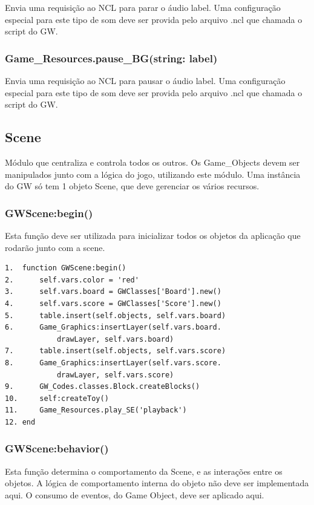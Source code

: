 \documentclass[
	12pt,				%
	openright,			%
	oneside,			%
	a4paper,			%
	brazil,				%
	]{abntex2}
\begin{document}
Envia uma requisição ao NCL para parar o áudio label. Uma configuração especial para este tipo de som deve ser provida pelo arquivo .ncl que chamada o script do GW.

\subsubsection{Game\_Resources.pause\_BG(string: label)}

Envia uma requisição ao NCL para pausar o áudio label. Uma configuração especial para este tipo de som deve ser provida pelo arquivo .ncl que chamada o script do GW.

\subsection{Scene}

Módulo que centraliza e controla todos os outros. Os Game\_Objects devem ser manipulados junto com a lógica do jogo, utilizando este módulo. Uma instância do GW só tem 1 objeto Scene, que deve gerenciar os vários recursos. 

\subsubsection{GWScene:begin()}

Esta função deve ser utilizada para inicializar todos os objetos da aplicação que rodarão junto com a scene.

\begin{lstlisting}[caption={Exemplo de uso da função begin},label=cod_scene_1,frame=single]
1.	function GWScene:begin()
2.		self.vars.color = 'red'
3.		self.vars.board = GWClasses['Board'].new()
4.		self.vars.score = GWClasses['Score'].new()
5.		table.insert(self.objects, self.vars.board)
6.		Game_Graphics:insertLayer(self.vars.board.
			drawLayer, self.vars.board)
7.		table.insert(self.objects, self.vars.score)
8.		Game_Graphics:insertLayer(self.vars.score.
			drawLayer, self.vars.score)
9.		GW_Codes.classes.Block.createBlocks()
10.		self:createToy()
11.		Game_Resources.play_SE('playback')
12.	end
\end{lstlisting}

\subsubsection{GWScene:behavior()}

Esta função determina o comportamento da Scene, e as interações entre os objetos. A lógica de comportamento interna do objeto não deve ser implementada aqui. O consumo de eventos, do Game Object, deve ser aplicado aqui.
\end{document}
